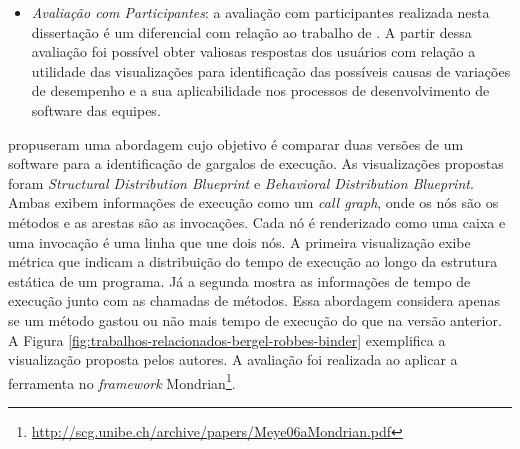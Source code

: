 \begin{itemize}
   \item \textit{Avaliação com Participantes}: a avaliação com participantes realizada nesta dissertação é um diferencial com relação ao trabalho de \citeauthor{SandovalAlcocer2013}. A partir dessa avaliação foi possível obter valiosas respostas dos usuários com relação a utilidade das visualizações para identificação das possíveis causas de variações de desempenho e a sua aplicabilidade nos processos de desenvolvimento de software das equipes.
\end{itemize}


\citeauthor{Bergel} propuseram uma abordagem cujo objetivo é comparar duas versões de um software para a identificação de gargalos de execução. As visualizações propostas foram \textit{Structural Distribution Blueprint} e \textit{Behavioral Distribution Blueprint}. Ambas exibem informações de execução como um \textit{call graph}, onde os nós são os métodos e as arestas são as invocações. Cada nó é renderizado como uma caixa e uma invocação é uma linha que une dois nós. A primeira visualização exibe métrica que indicam a distribuição do tempo de execução ao longo da estrutura estática de um programa. Já a segunda mostra as informações de tempo de execução junto com as chamadas de métodos. Essa abordagem considera apenas se um método gastou ou não mais tempo de execução do que na versão anterior. A Figura \ref{fig:trabalhos-relacionados-bergel-robbes-binder} exemplifica a visualização proposta pelos autores. A avaliação foi realizada ao aplicar a ferramenta no \textit{framework} Mondrian\footnote{\href{http://scg.unibe.ch/archive/papers/Meye06aMondrian.pdf}{http://scg.unibe.ch/archive/papers/Meye06aMondrian.pdf}}.

